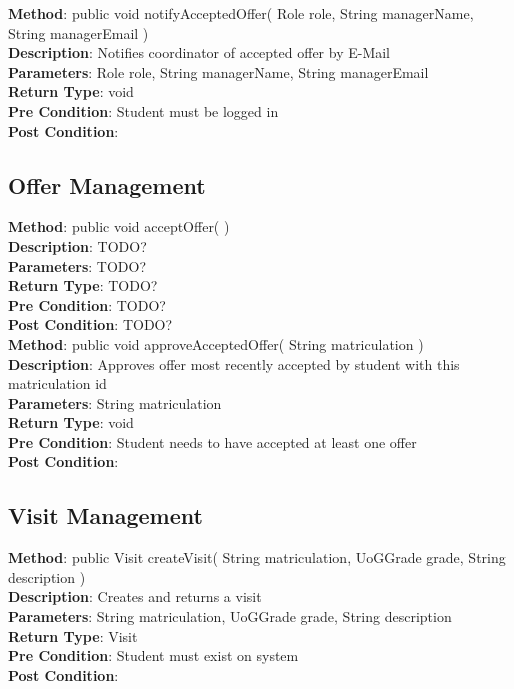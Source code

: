 \documentclass{l3deliverable}
\begin{document}
\textbf{Method}: public void notifyAcceptedOffer( Role role, String managerName, String managerEmail )\\
\textbf{Description}: Notifies coordinator of accepted offer by E-Mail\\
\textbf{Parameters}: Role role, String managerName, String managerEmail\\
\textbf{Return Type}: void\\
\textbf{Pre Condition}: Student must be logged in\\
\textbf{Post Condition}:\\

\subsection{Offer Management}
\textbf{Method}: public void acceptOffer( ) \\
\textbf{Description}: TODO?\\
\textbf{Parameters}: TODO?\\
\textbf{Return Type}: TODO?\\
\textbf{Pre Condition}: TODO?\\
\textbf{Post Condition}: TODO?\\

\textbf{Method}: public void approveAcceptedOffer( String matriculation )\\
\textbf{Description}: Approves offer most recently accepted by student with this matriculation id\\
\textbf{Parameters}: String matriculation\\
\textbf{Return Type}: void\\
\textbf{Pre Condition}: Student needs to have accepted at least one offer \\
\textbf{Post Condition}:\\

\subsection{Visit Management}
\textbf{Method}: public Visit createVisit( String matriculation, UoGGrade grade, String description )\\
\textbf{Description}: Creates and returns a visit\\
\textbf{Parameters}: String matriculation, UoGGrade grade, String description\\
\textbf{Return Type}: Visit\\
\textbf{Pre Condition}: Student must exist on system\\
\textbf{Post Condition}:\\
\end{document}
